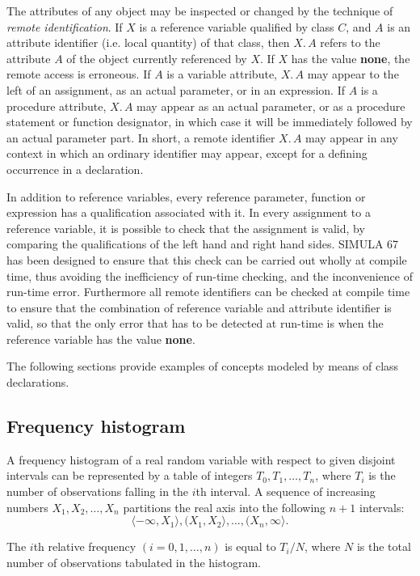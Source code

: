 \documentclass[twoside,11pt]{book}
\begin{document}
The attributes of any object may be inspected or changed by the technique of \textit{remote identification}. If $X$ is a reference variable qualified by class $C$, and $A$ is an attribute identifier (i.e. local quantity) of that class, then $X.\,A$ refers to the attribute $A$ of the object currently referenced by $X$. If $X$ has the value \textbf{none}, the remote access is erroneous. If $A$ is a variable attribute, $X.\,A$ may appear to the left of an assignment, as an actual parameter, or in an expression. If $A$ is a procedure attribute, $X.\,A$ may appear as an actual parameter, or as a procedure statement or function designator, in which case it will be immediately followed by an actual parameter part. In short, a remote identifier $X.\,A$ may appear in any context in which an ordinary identifier may appear, except for a defining occurrence in a declaration.

In addition to reference variables, every reference parameter, function or expression has a qualification associated with it. In every assignment to a reference variable, it is possible to check that the assignment is valid, by comparing the qualifications of the left hand and right hand sides. SIMULA 67 has been designed to ensure that this check can be carried out wholly at compile time, thus avoiding the inefficiency of run-time checking, and the inconvenience of run-time error. Furthermore all remote identifiers can be checked at compile time to ensure that the combination of reference variable and attribute identifier is valid, so that the only error that has to be detected at run-time is when the reference variable has the value \textbf{none}.

The following sections provide examples of concepts modeled by means of class declarations.


\subsection{Frequency histogram}
\label{sec:frequency-histogram}

A frequency histogram of a real random variable with respect to given disjoint intervals can be represented by a table of integers $T_0, T_1, \dots, T_n$, where $T_i$ is the number of observations falling in the $i$th interval. A sequence of increasing numbers $X_1, X_2, \dots, X_n$ partitions the real axis into the following $n + 1$ intervals:
$$
\langle -\infty, X_1\rangle, (X_1, X_2\rangle, \dots, (X_n, \infty\rangle.
$$

\noindent
The $i$th relative frequency $(i = 0, 1, \dots, n)$ is equal to $T_i / N$, where $N$ is the total number of observations tabulated in the histogram.
\end{document}
